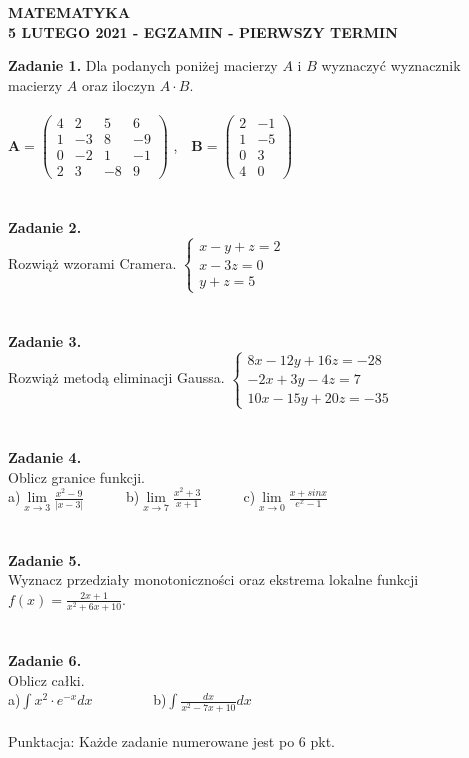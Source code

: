 \documentclass[12pt,a4paper]{report}
\begin{document}
\begin{center}

\textbf{MATEMATYKA \\5 LUTEGO 2021 - EGZAMIN - PIERWSZY TERMIN}

\end{center}\textbf{Zadanie 1.} Dla podanych poniżej macierzy $A$ i $B$ wyznaczyć wyznacznik macierzy $A$ oraz iloczyn $A\cdot B$. \\\\ $\mathbf{A} =\left( \begin{array}{cccc}4 & 2& 5 & 6\\1 & -3& 8 & -9\\0 & -2& 1 & -1\\2 & 3 & -8 & 9 \end{array} \right)$ ,\ \ $\mathbf{B} =\left( \begin{array}{cccc}2 & -1\\1 & -5\\0 & 3\\4 & 0  \end{array} \right)$\\\\\\\textbf{Zadanie 2.}  \\Rozwiąż wzorami Cramera. $\left\{ \begin{array}{ll}x-y+z=2\\x-3z=0\\y+z=5\end{array}\right.$\\\\\\\textbf{Zadanie 3.} \\Rozwiąż metodą eliminacji Gaussa. $\left\{ \begin{array}{ll}8x-12y+16z=-28\\-2x+3y-4z=7\\10x-15y+20z=-35\end{array} \right.$\\\\\\\textbf{Zadanie 4.} \\Oblicz granice funkcji.\\a)$\lim\limits_{x\to 3}\frac{x^2-9}{\vert x-3\vert}$\ \ \ \ \ \  b)$\lim\limits_{x\to 7}\frac{x^2+3}{x+1}$\ \ \ \ \ \ c)$\lim\limits_{x\to 0} \frac{x+sinx}{e^x-1}$\\\\\\\textbf{Zadanie 5.}\\Wyznacz przedziały monotoniczności oraz ekstrema lokalne funkcji $f(x)=\frac{2x+1}{x^2+6x+10}$.\\\\\\\textbf{Zadanie 6.} \\Oblicz całki. \\a)$\int x^2\cdot e^{-x} dx$ \ \ \ \ \ \ \ \ b)$\int \frac{dx}{x^2-7x+10} dx$\\\\Punktacja: Każde zadanie numerowane jest po 6 pkt.
\end{document}
